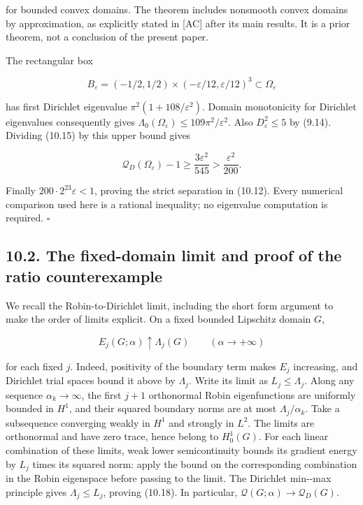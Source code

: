 \documentclass[11pt]{article}
\begin{document}
for bounded convex domains. The theorem includes nonsmooth convex
domains by approximation, as explicitly stated in {[}AC{]} after its
main results. It is a prior theorem, not a conclusion of the present
paper.

The rectangular box

\[
B_\varepsilon=(-1/2,1/2)\times(-\varepsilon/12,\varepsilon/12)^3
\subset\Omega_\varepsilon
\tag{10.16}
\]

has first Dirichlet eigenvalue \(\pi^2(1+108/\varepsilon^2)\). Domain
monotonicity for Dirichlet eigenvalues consequently gives
\(\Lambda_0(\Omega_\varepsilon)\le109\pi^2/\varepsilon^2\). Also
\(D_\varepsilon^2\le5\) by (9.14). Dividing (10.15) by this upper bound
gives

\[
\mathcal Q_D(\Omega_\varepsilon)-1
\ge\frac{3\varepsilon^2}{545}
>\frac{\varepsilon^2}{200}.
\tag{10.17}
\]

Finally \(200\cdot2^{23}\varepsilon<1\), proving the strict separation
in (10.12). Every numerical comparison used here is a rational
inequality; no eigenvalue computation is required. \(\square\)

\subsection{10.2. The fixed-domain limit and proof of the ratio
counterexample}\label{the-fixed-domain-limit-and-proof-of-the-ratio-counterexample}

We recall the Robin-to-Dirichlet limit, including the short form
argument to make the order of limits explicit. On a fixed bounded
Lipschitz domain \(G\),

\[
E_j(G;\alpha)\uparrow\Lambda_j(G)
\qquad(\alpha\to+\infty)
\tag{10.18}
\]

for each fixed \(j\). Indeed, positivity of the boundary term makes
\(E_j\) increasing, and Dirichlet trial spaces bound it above by
\(\Lambda_j\). Write its limit as \(L_j\le\Lambda_j\). Along any
sequence \(\alpha_k\to\infty\), the first \(j+1\) orthonormal Robin
eigenfunctions are uniformly bounded in \(H^1\), and their squared
boundary norms are at most \(\Lambda_j/\alpha_k\). Take a subsequence
converging weakly in \(H^1\) and strongly in \(L^2\). The limits are
orthonormal and have zero trace, hence belong to \(H_0^1(G)\). For each
linear combination of these limits, weak lower semicontinuity bounds its
gradient energy by \(L_j\) times its squared norm: apply the bound on
the corresponding combination in the Robin eigenspace before passing to
the limit. The Dirichlet min-\/-max principle gives
\(\Lambda_j\le L_j\), proving (10.18). In particular,
\(\mathcal Q(G;\alpha)\to\mathcal Q_D(G)\).
\end{document}
